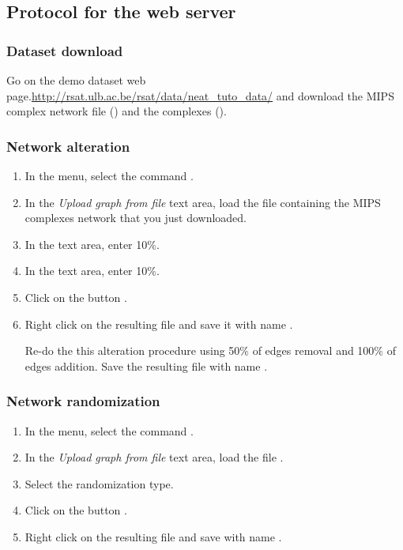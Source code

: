 \subsection{Protocol for the web server}

\subsubsection{Dataset download}
Go on the demo dataset web page.\url{http://rsat.ulb.ac.be/rsat/data/neat\_tuto\_data/} and download the MIPS complex network file () and the complexes ().

\subsubsection{Network alteration}

\begin{enumerate}

\item In the \neat menu, select the command . 
\item In the \textit{Upload graph from file} text area, load the file  containing the MIPS complexes network that you just downloaded.
\item In the  text area, enter 10\%.
\item In the  text area, enter 10\%.
\item Click on the button . 
\item Right click on the resulting file and save it with name .

Re-do the this alteration procedure using 50\% of edges removal and 100\% of edges addition. Save the resulting file with name .

\end{enumerate}

\subsubsection{Network randomization}

\begin{enumerate}

\item In the \neat menu, select the command . 
\item In the \textit{Upload graph from file} text area, load the file .
\item Select the  randomization type.
\item Click on the button . 
\item Right click on the resulting file and save with name .

\end{enumerate}

